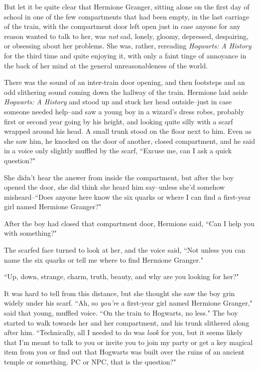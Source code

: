 But let it be quite clear that Hermione Granger, sitting alone on the first day of school in one of the few compartments that had been empty, in the last carriage of the train, with the compartment door left open just in case anyone for any reason wanted to talk to her, was \emph{not} sad, lonely, gloomy, depressed, despairing, or obsessing about her problems. She was, rather, rereading \emph{Hogwarts: A History} for the third time and quite enjoying it, with only a faint tinge of annoyance in the back of her mind at the general unreasonableness of the world.

There was the sound of an inter-train door opening, and then footsteps and an odd slithering sound coming down the hallway of the train. Hermione laid aside \emph{Hogwarts: A History} and stood up and stuck her head outside\---just in case someone needed help\---and saw a young boy in a wizard's dress robes, probably first or second year going by his height, and looking quite silly with a scarf wrapped around his head. A small trunk stood on the floor next to him. Even as she saw him, he knocked on the door of another, closed compartment, and he said in a voice only slightly muffled by the scarf, ``Excuse me, can I ask a quick question?"

She didn't hear the answer from inside the compartment, but after the boy opened the door, she did think she heard him say\---unless she'd somehow misheard\---``Does anyone here know the six quarks or where I can find a first-year girl named Hermione Granger?"

After the boy had closed that compartment door, Hermione said, ``Can I help you with something?"

The scarfed face turned to look at her, and the voice said, ``Not unless you can name the six quarks or tell me where to find Hermione Granger."

``Up, down, strange, charm, truth, beauty, and why are you looking for her?"

It was hard to tell from this distance, but she thought she saw the boy grin widely under his scarf. ``Ah, so \emph{you're} a first-year girl named Hermione Granger," said that young, muffled voice. ``On the train to Hogwarts, no less." The boy started to walk towards her and her compartment, and his trunk slithered along after him. ``Technically, all I needed to do was \emph{look} for you, but it seems likely that I'm meant to talk to you or invite you to join my party or get a key magical item from you or find out that Hogwarts was built over the ruins of an ancient temple or something. PC or NPC, that is the question?"

